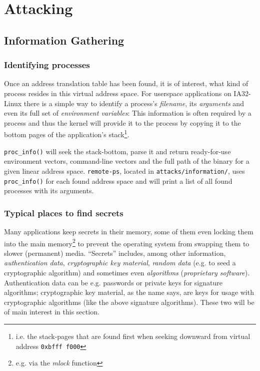 %
%

\section{Attacking}




\subsection{Information Gathering}

\subsubsection{Identifying processes}

\label{identifying_processes}  Once an address translation table has been found,
it is of interest, what kind of process resides in this virtual address space.
For userspace applications on IA32-Linux there is a simple way to identify a
process's \emph{filename}, its \emph{arguments} and even its full set of
\emph{environment variables}: This information is often required by a process
and thus the kernel will provide it to the process by copying it to the bottom
pages of the application's stack\footnote{i.e.  the stack-pages that are found
first when seeking downward from virtual address \texttt{0xbfff~f000}}.

\texttt{proc\_info()} will seek the stack-bottom, parse it and return
ready-for-use environment vectors, command-line vectors and the full path of the
binary for a given linear address space. \texttt{remote-ps}, located in
\texttt{attacks/information/}, uses \texttt{proc\_info()} for each found address
space and will print a list of all found processes with its arguments.


\subsubsection{Typical places to find secrets}

Many applications keep secrets in their memory, some of them even locking them
into the main memory\footnote{e.g. via the \emph{mlock} function} to prevent the
operating system from swapping them to slower (permanent) media.  ``Secrets''
includes, among other information, \emph{authentication data},
\emph{cryptographic key material}, \emph{random data} (e.g. to seed a
cryptographic algorithm) and sometimes even \emph{algorithms} (\emph{proprietary
software}). Authentication data can be e.g.  passwords or private keys for
signature algorithms; cryptographic key material, as the name says, are keys for
usage with cryptographic algorithms (like the above signature algorithms). These
two will be of main interest in this section.

